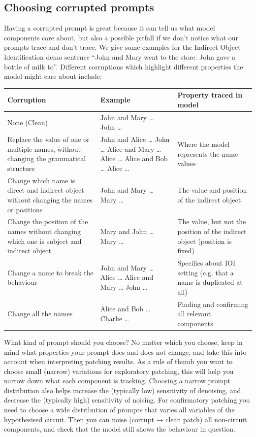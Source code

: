 \documentclass[nonatbib]{article}
\begin{document}
\subsection{Choosing corrupted prompts}
Having a corrupted prompt is great because it can tell us what model components care about, but also a possible pitfall if we don’t notice what our prompts trace and don’t trace. We give some examples for the Indirect Object Identification \citep[IOI,][]{IOI} demo sentence “John and Mary went to the store. John gave a bottle of milk to”. Different corruptions which highlight different properties the model might care about include:

\begin{adjustbox}{width=1\textwidth,center=\textwidth}
  \begin{tabular}{p{6.6cm}p{4cm}p{3.5cm}}
    \toprule
    Corruption & Example & Property traced in model \\
    \midrule
    None (Clean) & John and Mary … John … & \\
    Replace the value of one or multiple names, without changing the grammatical structure &
      John and Alice … John …
      Alice and Mary … Alice …
      Alice and Bob … Alice … &
      Where the model represents the name values \\
    Change which name is direct and indirect object without changing the names or positions &
      John and Mary … Mary … &
      The value and position of the indirect object \\
    Change the position of the names without changing which one is subject and indirect object &
      Mary and John … Mary … &
      The value, but not the position of the indirect object (position is fixed)  \\
    Change a name to break the behaviour &
      John and Mary … Alice …
      Alice and Mary … John … &
      Specifics about IOI setting (e.g. that a name is duplicated at all) \\
    Change all the names &
      Alice and Bob … Charlie … &
      Finding and confirming all relevant components \\
    \bottomrule
  \end{tabular}
\end{adjustbox}
\vspace{0.15cm}

What kind of prompt should you choose? No matter which you choose, keep in mind what properties your prompt does and does not change, and take this into account when interpreting patching results. As a rule of thumb you want to choose small (narrow) variations for exploratory patching, this will help you narrow down what each component is tracking. Choosing a narrow prompt distribution also helps increase the (typically low) sensitivity of denoising, and decrease the (typically high) sensitivity of noising. For confirmatory patching you need to choose a wide distribution of prompts that varies all variables of the hypothesised circuit. Then you can noise (corrupt → clean patch) all non-circuit components, and check that the model still shows the behaviour in question.
\end{document}
